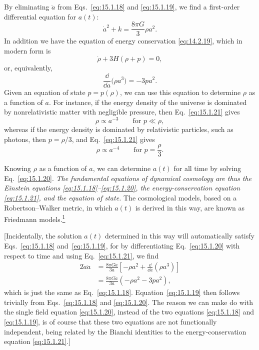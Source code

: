 By eliminating \(\ddot a\) from Eqs.~\eqref{eq:15.1.18} and
\eqref{eq:15.1.19}, we find a first-order differential equation for \(a(t)\):
\begin{equation}
  \dot a^2+k=\frac{8\pi G}{3}\rho a^2.
  \tag{15.1.20}\label{eq:15.1.20}
\end{equation}
In addition we have the equation of energy conservation
\eqref{eq:14.2.19}, which in modern form is
\[
  \dot\rho+3H(\rho+p)=0,
\]
or, equivalently,
\begin{equation}
  \frac{\dd}{\dd a}\bigl(\rho a^3\bigr)=-3pa^2.
  \tag{15.1.21}\label{eq:15.1.21}
\end{equation}
Given an equation of state \(p=p(\rho)\), we can use this equation to
determine \(\rho\) as a function of \(a\). For instance, if the energy
density of the universe is dominated by nonrelativistic matter with negligible
pressure, then Eq.~\eqref{eq:15.1.21} gives
\begin{equation}
  \rho\propto a^{-3}
  \qquad\text{for }p\ll\rho,
  \tag{15.1.22}\label{eq:15.1.22}
\end{equation}
whereas if the energy density is dominated by relativistic particles, such as
photons, then \(p=\rho/3\), and Eq.~\eqref{eq:15.1.21} gives
\begin{equation}
  \rho\propto a^{-4}
  \qquad\text{for }p=\frac{\rho}{3}.
  \tag{15.1.23}\label{eq:15.1.23}
\end{equation}

Knowing \(\rho\) as a function of \(a\), we can determine \(a(t)\) for all
time by solving Eq.~\eqref{eq:15.1.20}. \emph{The fundamental equations of
dynamical cosmology are thus the Einstein equations\allowbreak
\eqref{eq:15.1.18}--\eqref{eq:15.1.20}, the energy-conservation equation
\eqref{eq:15.1.21}, and the equation of state.} The cosmological models,
based on a Robertson--Walker metric, in which \(a(t)\) is derived in this way,
are known as Friedmann models.\hyperref[ch15-ref-1]{\textsuperscript{1}}

[Incidentally, the solution \(a(t)\) determined in this way will
automatically satisfy Eqs.~\allowbreak\eqref{eq:15.1.18}
and\allowbreak\ \eqref{eq:15.1.19}, for by differentiating
Eq.~\allowbreak\eqref{eq:15.1.20} with respect to time and using
Eq.~\eqref{eq:15.1.21}, we find
\begin{align*}
  2\dot a\ddot a
  &=
  \frac{8\pi G\dot a}{3a}
  \left[
    -\rho a^2+\frac{\dd}{\dd a}(\rho a^3)
  \right]\\
  &=
  \frac{8\pi G\dot a}{3a}
  \left(-\rho a^2-3pa^2\right),
\end{align*}
which is just the same as Eq.~\eqref{eq:15.1.18}.
Equation~\eqref{eq:15.1.19} then follows trivially from
Eqs.~\eqref{eq:15.1.18} and \eqref{eq:15.1.20}. The reason we can make
do with the single field equation \eqref{eq:15.1.20}, instead of the two
equations \eqref{eq:15.1.18} and \eqref{eq:15.1.19}, is of course that
these two equations are not functionally independent, being related by the
Bianchi identities to the energy-conservation equation
\eqref{eq:15.1.21}.]

